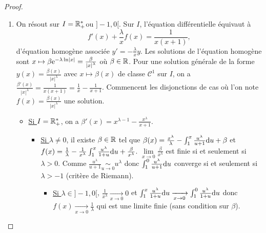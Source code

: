 \documentclass[12pt]{article}
\begin{document}
\begin{proof}
	\phantom{}
	\begin{enumerate}
		\item On résout sur $I=\mathbb{R}_{+}^{*}$ou $]-1,0[$. Sur $I$, l'équation différentielle équivaut à 
		\begin{equation*}
			f'(x)+\frac{\lambda}{x}f(x)=\frac{1}{x(x+1)},
		\end{equation*}
		d'équation homogène associée $y'=-\frac{\lambda}{x}y$. Les solutions de l'équation homogène sont $x\mapsto\beta\mathrm{e}^{-\lambda\ln\left\lvert x\right\rvert}=\frac{\beta}{\left\lvert x\right\rvert^{\lambda}}$ où $\beta\in\mathbb{R}$.
		Pour une solution générale de la forme $y(x)=\frac{\beta(x)}{\left\lvert x\right\rvert^{\lambda}}$ avec $x\mapsto\beta(x)$ de classe $\mathcal{C}^{1}$ sur $I$, on a $\frac{\beta'(x)}{\left\lvert x\right\rvert^{\lambda}}=\frac{1}{x(x+1)}=\frac{1}{x}-\frac{1}{x+1}$. Commencent les disjonctions de cas où l'on note $f(x)=\frac{\beta(x)}{\left\lvert x\right\rvert^{\lambda}}$ une solution.

		\begin{itemize}
			\item \underline{Si $I=\mathbb{R}_{+}^{*}$}, on a $\beta'(x)=x^{\lambda-1}-\frac{x^{\lambda}}{x+1}$.
			
			\begin{itemize}
				\item \underline{Si $\lambda\neq0$}, il existe $\beta\in\mathbb{R}$ tel que $\beta(x)=\frac{x^{\lambda}}{\lambda}-\int_{1}^{x}\frac{u^{\lambda}}{u+1}\mathrm{d} u+\beta$ et $f(x)=\frac{1}{\lambda}-\frac{1}{x^{\lambda}}\int_{1}^{x}\frac{u^{\lambda}}{1+u}\mathrm{d} u+\frac{\beta}{x^{\lambda}}$. $\lim\limits_{x\to0}\frac{\beta}{x^{\lambda}}$ est finie si et seulement si $\lambda>0$. Comme $\frac{u^{\lambda}}{u+1}\underset{u\to0}{\sim}u^{\lambda}$ donc $\int_{1}^{0}\frac{u^{\lambda}}{u+1}\mathrm{d} u$ converge si et seulement si $\lambda>-1$ (critère de Riemann).
				
				\begin{itemize}
					\item \underline{Si $\lambda\in]-1,0[$}, $\frac{1}{x^{\lambda}}\xrightarrow[x\to0]{}0$ et $\int_{1}^{x}\frac{u^{\lambda}}{1+u}\mathrm{d} u\xrightarrow[x\to0]{}\int_{1}^{0}\frac{u^{\lambda}}{1+u}\mathrm{d} u$ donc $f(x)\xrightarrow[x\to0]{}\frac{1}{\lambda}$ qui est une limite finie (sans condition sur $\beta$).
					

\end{itemize}
\end{itemize}
\end{itemize}
\end{enumerate}
\end{proof}
\end{document}
